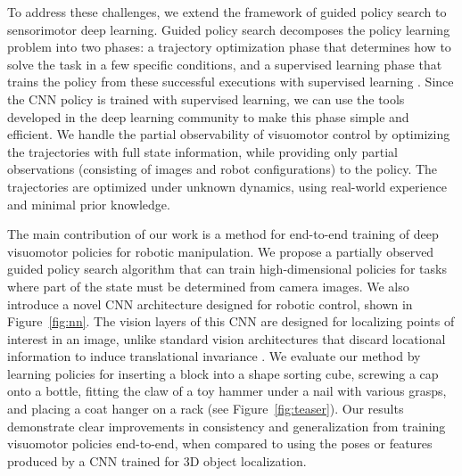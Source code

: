 \documentclass[conference]{IEEEtran}
\begin{document}
To address these challenges, we extend the framework of guided policy search to sensorimotor deep learning. Guided policy search decomposes the policy learning problem into two phases: a trajectory optimization phase that determines how to solve the task in a few specific conditions, and a supervised learning phase that trains the policy from these successful executions with supervised learning \cite{lk-lcnnp-14}. Since the CNN policy is trained with supervised learning, we can use the tools developed in the deep learning community to make this phase simple and efficient. We handle the partial observability of visuomotor control by optimizing the trajectories with full state information, while providing only partial observations (consisting of images and robot configurations) to the policy. The trajectories are optimized under unknown dynamics, using real-world experience and minimal prior knowledge.


The main contribution of our work is a method for end-to-end training of deep visuomotor policies for robotic manipulation. We propose a partially observed guided policy search algorithm that can train high-dimensional policies for tasks where part of the state must be determined from camera images.
We also introduce a novel CNN architecture designed for robotic control, shown in Figure~\ref{fig:nn}. The vision layers of this CNN are designed for localizing points of interest in an image, unlike standard vision architectures that discard locational information to induce translational invariance \cite{ksh-incdc-12}. We evaluate our method by learning policies for inserting a block into a shape sorting cube, screwing a cap onto a bottle, fitting the claw of a toy hammer under a nail with various grasps, and placing a coat hanger on a rack (see Figure~\ref{fig:teaser}). Our results demonstrate clear improvements in consistency and generalization from training visuomotor policies end-to-end, when compared to using the poses or features produced by a CNN trained for 3D object localization.
\end{document}
